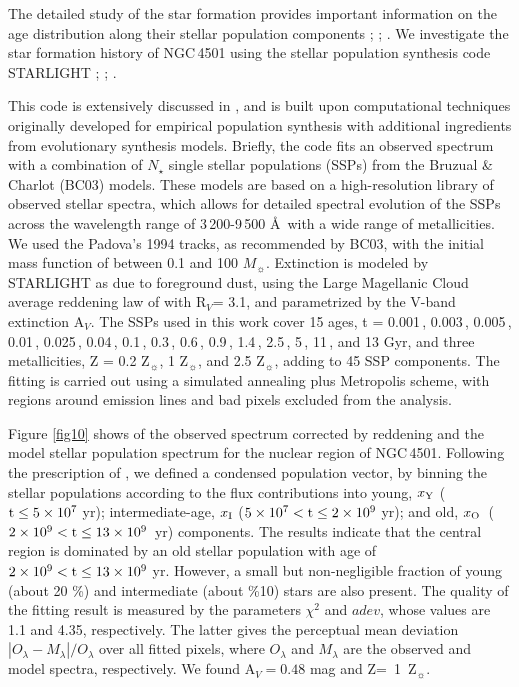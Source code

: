 \documentclass[fleqn,usenatbib]{mnras}
\begin{document}
The detailed study of the star formation  provides important information on the age distribution along their stellar population components \citep{Krabbe2011}; 
\citep{Faundez-Abans2015}; \citep{Dors2016}. 
We investigate the star formation history of NGC\,4501 using the stellar population synthesis code {\sc STARLIGHT} 
\citep{CidFernandes2004,CidFernandes2005}; \citep{Mateus2006}; \citep{Asari2007}. 

This code is extensively discussed in \citet{CidFernandes2004,CidFernandes2005}, and 
is built upon computational techniques originally developed for empirical population synthesis with 
additional ingredients from evolutionary synthesis models. Briefly, the code fits an observed spectrum with 
a combination of $N_{\star}$ single stellar populations (SSPs) from the Bruzual \& Charlot \citep{Bruzual2003} (BC03) models. 
These models are based on a high-resolution library of observed stellar spectra, which allows for detailed spectral evolution of the 
SSPs across the wavelength range of 3\,200-9\,500 \AA  ~with a wide range of metallicities. We used the Padova's 1994 tracks, as recommended 
by BC03, with the initial mass function of \citet{Chabrier2003} between 0.1 and 100 $M_{\sun}$. 
Extinction is modeled by {\sc STARLIGHT} as due to foreground dust, using the Large Magellanic Cloud average reddening
law of \citet{Gordon2003} with  R$_V$= 3.1, and parametrized by the V-band extinction  A$_V$. 
The SSPs used in this work cover 15 ages, t = 0.001\,, 0.003\,, 0.005\,, 0.01\,, 0.025\,, 0.04\,, 0.1\,,  0.3\,, 0.6\,, 0.9\,, 1.4\,, 2.5\,, 5\,, 11\,, and 13 Gyr, and 
three metallicities, Z = 0.2 Z$_{\sun}$, 1 Z$_{\sun}$, and 2.5 Z$_{\sun}$, adding to  45 SSP components. The fitting is 
carried out using  a simulated annealing plus Metropolis scheme, with regions around emission lines and bad pixels excluded from the analysis.
 
Figure \ref{fig10}  shows  of the  observed spectrum corrected by reddening and the
model stellar population spectrum for the nuclear region of NGC\,4501. 
Following the prescription of \citet{CidFernandes2005}, we defined a condensed population vector, by binning the stellar populations 
according to the flux contributions into young, $x_{\rm Y}$ ($\rm t \leq 5\times10^{7}$ yr);
intermediate-age,  $x_{\rm I}$ ($ 5\times10^{7} <\rm t \leq 2\times10^{9}$ yr); and 
old, \mbox{$x_{\rm O}$ ( $2\times10^{9} <\rm t \leq 13\times10^{9}$ yr)} components.  The results indicate that 
the central region is dominated by an old stellar population with age of 
$2\times10^{9} <\rm t \leq 13\times10^{9}$ yr. However, a small but non-negligible fraction of young (about 20 \%) and intermediate (about \%10) stars are also present.
The quality of the fitting result is measured by the parameters 
$\chi^{2}$ and  $adev$, whose values are  1.1  and  4.35, respectively. The latter gives the perceptual mean deviation $|O_{\lambda} - M_{\lambda}|/O_{\lambda}$ over all fitted pixels,
where $O_{\lambda}$ and $M_{\lambda}$ are the observed and model spectra, respectively. We found A$_V=0.48$ mag and \mbox{Z= 1  Z$_{\sun}$}.
\end{document}
